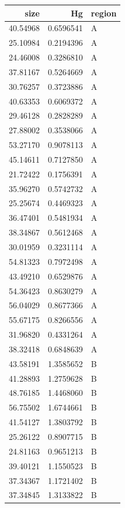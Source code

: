 \documentclass[
  letterpaper,
  DIV=11,
  numbers=noendperiod]{scrartcl}
\begin{document}
\begin{table}
\centering
\begin{tabular}[t]{r|r|l}
\hline
size & Hg & region\\
\hline
40.54968 & 0.6596541 & A\\
\hline
25.10984 & 0.2194396 & A\\
\hline
24.46008 & 0.3286810 & A\\
\hline
37.81167 & 0.5264669 & A\\
\hline
30.76257 & 0.3723886 & A\\
\hline
40.63353 & 0.6069372 & A\\
\hline
29.46128 & 0.2828289 & A\\
\hline
27.88002 & 0.3538066 & A\\
\hline
53.27170 & 0.9078113 & A\\
\hline
45.14611 & 0.7127850 & A\\
\hline
21.72422 & 0.1756391 & A\\
\hline
35.96270 & 0.5742732 & A\\
\hline
25.25674 & 0.4469323 & A\\
\hline
36.47401 & 0.5481934 & A\\
\hline
38.34867 & 0.5612468 & A\\
\hline
30.01959 & 0.3231114 & A\\
\hline
54.81323 & 0.7972498 & A\\
\hline
43.49210 & 0.6529876 & A\\
\hline
54.36423 & 0.8630279 & A\\
\hline
56.04029 & 0.8677366 & A\\
\hline
55.67175 & 0.8266556 & A\\
\hline
31.96820 & 0.4331264 & A\\
\hline
38.32418 & 0.6848639 & A\\
\hline
43.58191 & 1.3585652 & B\\
\hline
41.28893 & 1.2759628 & B\\
\hline
48.76185 & 1.4468060 & B\\
\hline
56.75502 & 1.6744661 & B\\
\hline
41.54127 & 1.3803792 & B\\
\hline
25.26122 & 0.8907715 & B\\
\hline
24.81163 & 0.9651213 & B\\
\hline
39.40121 & 1.1550523 & B\\
\hline
37.34367 & 1.1721402 & B\\
\hline
37.34845 & 1.3133822 & B\\

\end{tabular}
\end{table}
\end{document}
